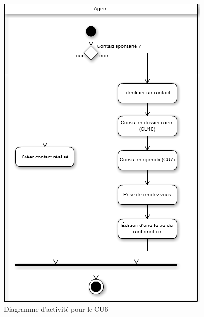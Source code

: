 \begin{figure}[H]
	\begin{center}
		\includegraphics[scale=0.4]{Includes/SOA-Activite-CU6.png}
		\caption{Diagramme d'activité pour le CU6}
	\end{center}
\end{figure}

